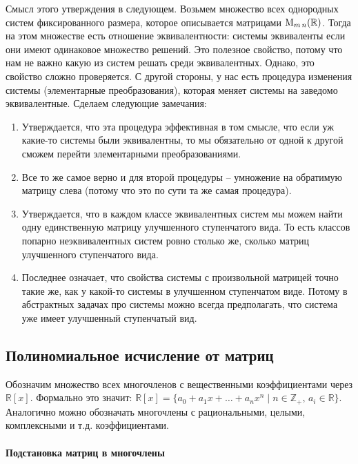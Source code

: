 Смысл этого утверждения в следующем.
Возьмем множество всех однородных систем фиксированного размера, которое описывается матрицами $\operatorname{M}_{m\,n}(\mathbb R)$.
Тогда на этом множестве есть отношение эквивалентности: системы эквиваленты если они имеют одинаковое множество решений.
Это полезное свойство, потому что нам не важно какую из систем решать среди эквивалентных.
Однако, это свойство сложно проверяется.
С другой стороны, у нас есть процедура изменения системы (элементарные преобразования), которая меняет системы на заведомо эквивалентные.
Сделаем следующие замечания:
\begin{enumerate}
\item Утверждается, что эта процедура эффективная в том смысле, что если уж какие-то системы были эквивалентны, то мы обязательно от одной к другой сможем перейти элементарными преобразованиями.

\item Все то же самое верно и для второй процедуры -- умножение на обратимую матрицу слева (потому что это по сути та же самая процедура).

\item Утверждается, что в каждом классе эквивалентных систем мы можем найти одну единственную матрицу улучшенного ступенчатого вида.
То есть классов попарно неэквивалентных систем ровно столько же, сколько матриц улучшенного ступенчатого вида.

\item Последнее означает, что свойства системы с произвольной матрицей точно такие же, как у какой-то системы в улучшенном ступенчатом виде.
Потому в абстрактных задачах про системы можно всегда предполагать, что система уже имеет улучшенный ступенчатый вид.
\end{enumerate}

\subsection{Полиномиальное исчисление от матриц}

Обозначим множество всех многочленов с вещественными коэффициентами через $\mathbb R[x]$.
Формально это значит: $\mathbb R[x]=\{a_0+a_1x + \ldots + a_n x^n\mid n\in \mathbb Z_{+},\, a_i\in \mathbb R\}$.
Аналогично можно обозначать многочлены с рациональными, целыми, комплексными и т.д. коэффициентами.


\paragraph{Подстановка матриц в многочлены}

